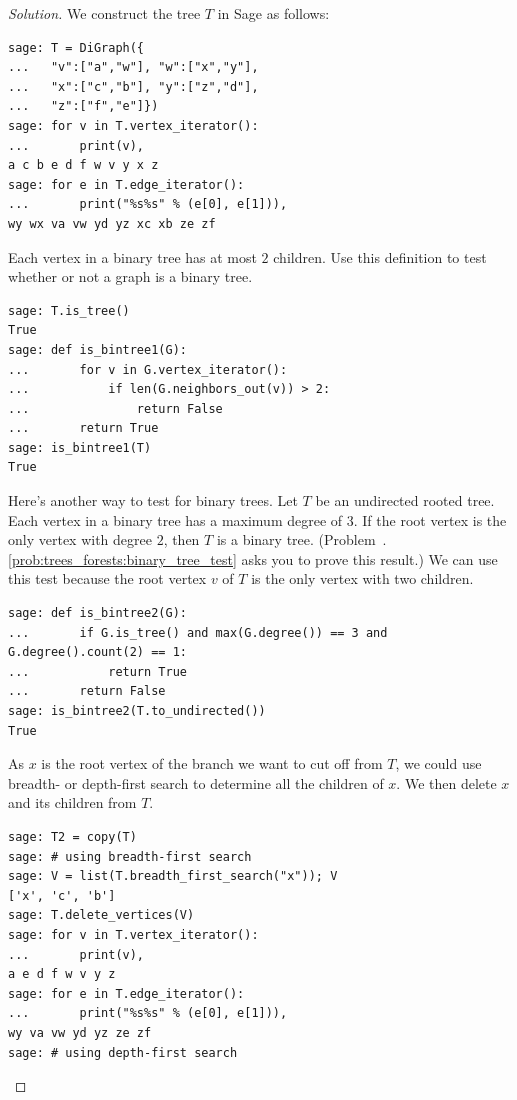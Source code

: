 \begin{proof}[Solution]
We construct the tree $T$ in Sage as follows:
\begin{lstlisting}
sage: T = DiGraph({
...   "v":["a","w"], "w":["x","y"],
...   "x":["c","b"], "y":["z","d"],
...   "z":["f","e"]})
sage: for v in T.vertex_iterator():
...       print(v),
a c b e d f w v y x z
sage: for e in T.edge_iterator():
...       print("%s%s" % (e[0], e[1])),
wy wx va vw yd yz xc xb ze zf
\end{lstlisting}
Each vertex in a binary tree has at most $2$
children. Use this definition to test whether or
not a graph is a binary tree.
\begin{lstlisting}
sage: T.is_tree()
True
sage: def is_bintree1(G):
...       for v in G.vertex_iterator():
...           if len(G.neighbors_out(v)) > 2:
...               return False
...       return True
sage: is_bintree1(T)
True
\end{lstlisting}
Here's another way to test for binary trees. Let
$T$ be an undirected rooted tree. Each vertex in a
binary tree has a maximum
degree of $3$. If the root vertex is the only
vertex with degree $2$, then $T$ is a binary tree.
(Problem~\thechapter.\ref{prob:trees_forests:binary_tree_test} asks
you to prove this result.) We can use this test because the
root vertex $v$ of $T$ is the only vertex with two
children.
\begin{lstlisting}
sage: def is_bintree2(G):
...       if G.is_tree() and max(G.degree()) == 3 and G.degree().count(2) == 1:
...           return True
...       return False
sage: is_bintree2(T.to_undirected())
True
\end{lstlisting}
As $x$ is the root vertex of the branch we want to
cut off from $T$, we could use
breadth- or
depth-first search to determine all the
children of $x$. We then delete $x$ and its children from $T$.
\begin{lstlisting}
sage: T2 = copy(T)
sage: # using breadth-first search
sage: V = list(T.breadth_first_search("x")); V
['x', 'c', 'b']
sage: T.delete_vertices(V)
sage: for v in T.vertex_iterator():
...       print(v),
a e d f w v y z
sage: for e in T.edge_iterator():
...       print("%s%s" % (e[0], e[1])),
wy va vw yd yz ze zf
sage: # using depth-first search

\end{lstlisting}
\end{proof}
